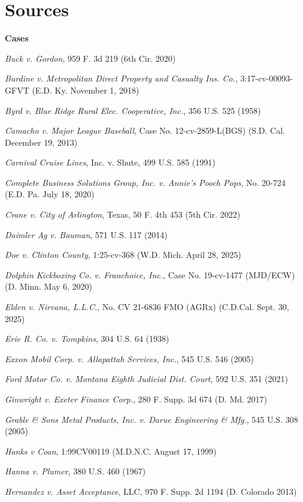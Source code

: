 \pagestyle{plain.scrheadings}

\chapter*{Sources}

{\bfseries\Large{Cases}}

\textit{Buck v. Gordon}, 959 F. 3d 219 (6th Cir. 2020)

\textit{Burdine v. Metropolitan Direct Property and Casualty Ins. Co.}, 3:17-cv-00093-GFVT (E.D. Ky. November 1, 2018)

\textit{Byrd v. Blue Ridge Rural Elec. Cooperative, Inc.}, 356 U.S. 525 (1958)

\textit{Camacho v. Major League Baseball}, Case No. 12-cv-2859-L(BGS) (S.D. Cal. December 19, 2013)

\textit{Carnival Cruise Lines}, Inc. v. Shute, 499 U.S. 585 (1991)

\textit{Complete Business Solutions Group, Inc. v. Annie’s Pooch Pops}, No. 20-724 (E.D. Pa. July 18, 2020)

\textit{Crane v. City of Arlington}, Texas, 50 F. 4th 453 (5th Cir. 2022)

\textit{Daimler Ag v. Bauman}, 571 U.S. 117 (2014)

\textit{Doe v. Clinton County}, 1:25-cv-368 (W.D. Mich. April 28, 2025)

\textit{Dolphin Kickboxing Co. v. Franchoice, Inc.}, Case No. 19-cv-1477 (MJD/ECW) (D. Minn. May 6, 2020)

\textit{Elden v. Nirvana, L.L.C.}, No. CV 21-6836 FMO (AGRx) (C.D.Cal. Sept. 30, 2025)

\textit{Erie R. Co. v. Tompkins}, 304 U.S. 64 (1938)

\textit{Exxon Mobil Corp. v. Allapattah Services, Inc.}, 545 U.S. 546 (2005)

\textit{Ford Motor Co. v. Montana Eighth Judicial Dist. Court}, 592 U.S. 351 (2021)

\textit{Ginwright v. Exeter Finance Corp.}, 280 F. Supp. 3d 674 (D. Md. 2017)

\textit{Grable \& Sons Metal Products, Inc. v. Darue Engineering \& Mfg.}, 545 U.S. 308 (2005)

\textit{Hanks v Coan}, 1:99CV00119 (M.D.N.C. August 17, 1999)

\textit{Hanna v. Plumer}, 380 U.S. 460 (1967)

\textit{Hernandez v. Asset Acceptance}, LLC, 970 F. Supp. 2d 1194 (D. Colorado 2013)


